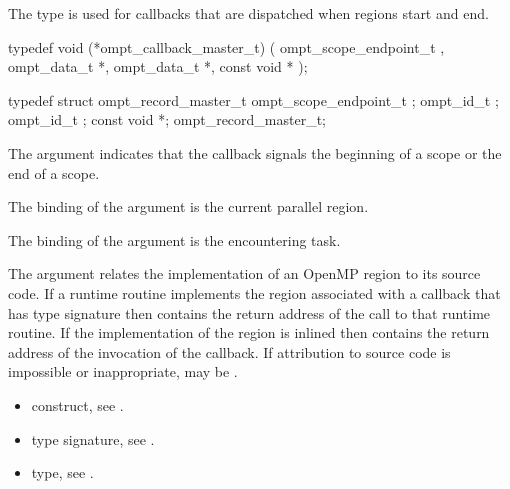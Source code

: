 \label{sec:ompt_callback_master_t}

\summary
The  type is used for callbacks that are 
dispatched when  regions start and end.

\format
\begin{ccppspecific}
\begin{omptCallback}
typedef void (*ompt_callback_master_t) (
  ompt_scope_endpoint_t ,
  ompt_data_t *,
  ompt_data_t *,
  const void *
);
\end{omptCallback}
\end{ccppspecific}

\record
\begin{ccppspecific}
\begin{omptRecord}
typedef struct ompt_record_master_t {
  ompt_scope_endpoint_t ;
  ompt_id_t ;
  ompt_id_t ;
  const void *;
} ompt_record_master_t;
\end{omptRecord}
\end{ccppspecific}

\argdesc
The  argument indicates that the callback signals
the beginning of a scope or the end of a scope.

The binding of the  argument is the current parallel region.

The binding of the  argument is the encountering task.

The  argument relates the implementation of an OpenMP region
to its source code. If a runtime routine implements the region associated with
a callback that has type signature  then
 contains the return address of the call to that runtime routine.
If the implementation of the region is inlined then  contains the
return address of the invocation of the callback. If attribution to source code
is impossible or inappropriate, may be .

\crossreferences
\begin{itemize}
\item {} construct, see .

\item {} type signature, see .

\item {} type, see .
\end{itemize}



